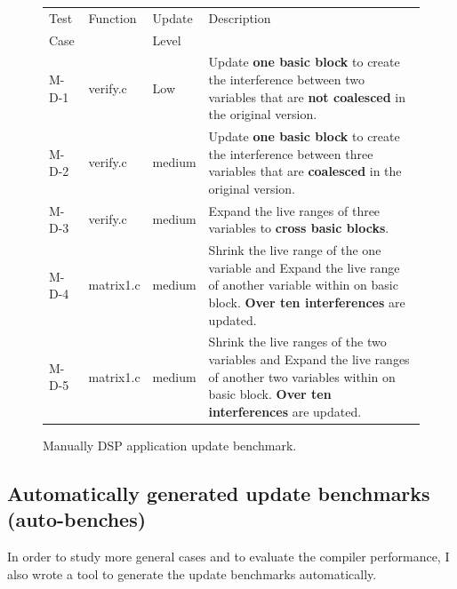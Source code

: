 \begin{figure}[htdp]
\begin{small}

\begin{center}
\begin{tabular}{||p{0.5in}|p{0.6in}|p{1.2in}|p{3.5in}||}
\hline
Test &   Function & Update &Description \\
Case & & Level&\\
\hline\hline
M-D-1  & verify.c& Low & Update \textbf{one basic block}  to create
the interference between two variables that are \textbf{not coalesced} in the original version.\\
\hline
M-D-2  & verify.c& medium & Update \textbf{one basic block} to create 
the interference between three variables that are \textbf{coalesced}
in the original version. \\
\hline
M-D-3  & verify.c& medium & Expand the live ranges of three variables to
\textbf{cross basic blocks}. \\
\hline
M-D-4   & matrix1.c& medium & Shrink the live range of the one variable and
Expand the live range of another variable within on basic block.  \textbf{ Over
ten interferences} are updated.\\
\hline
M-D-5 & matrix1.c& medium  & Shrink the live ranges of the two variables and
Expand the live ranges of another two variables within on basic block.
 \textbf{Over ten interferences} are updated.\\
\hline
\end{tabular}
\end{center}
\caption{Manually DSP application update benchmark.}
\label{dsp-manual}
\end{small}
\vspace{-0.1in}
\end{figure}%

\subsection{Automatically generated update benchmarks (auto-benches)}
In order to study more general cases and to evaluate the compiler performance,
I also wrote a tool to generate the update benchmarks automatically.

